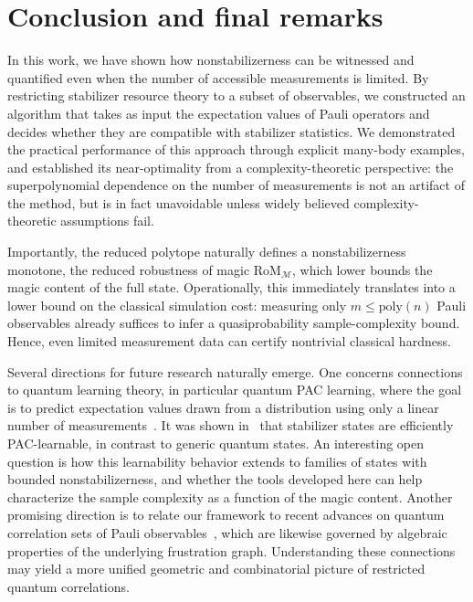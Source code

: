 \documentclass[10pt,aps,pra,twocolumn,floatfix,nofootinbib,superscriptaddress,longbibliography]{revtex4-2}
\newcommand{\1}{\mathbbm{1}}
\begin{document}
\section{Conclusion and final remarks}
\label{sec:discuss}



In this work, we have shown how nonstabilizerness can be witnessed and quantified even when the number of accessible measurements is limited. By restricting stabilizer resource theory to a subset of observables, we constructed an algorithm that takes as input the expectation values of Pauli operators and decides whether they are compatible with stabilizer statistics. We demonstrated the practical performance of this approach through explicit many-body examples, and established its near-optimality from a complexity-theoretic perspective: the superpolynomial dependence on the number of measurements is not an artifact of the method, but is in fact unavoidable unless widely believed complexity-theoretic assumptions fail.

Importantly, the reduced polytope naturally defines a nonstabilizerness monotone, the reduced robustness of magic $\mathrm{RoM}_{\mathcal M}$, which lower bounds the magic content of the full state. Operationally, this immediately translates into a lower bound on the classical simulation cost: measuring only $m \leq \mathrm{poly}(n)$ Pauli observables already suffices to infer a quasiprobability sample-complexity bound. Hence, even limited measurement data can certify nontrivial classical hardness.



Several directions for future research naturally emerge. One concerns connections to quantum learning theory, in particular quantum PAC learning, where the goal is to predict expectation values drawn from a distribution using only a linear number of measurements~\cite{aaronson2007learnability}. It was shown in~\cite{rocchetto2017stabiliser} that stabilizer states are efficiently PAC-learnable, in contrast to generic quantum states. An interesting open question is how this learnability behavior extends to families of states with bounded nonstabilizerness, and whether the tools developed here can help characterize the sample complexity as a function of the magic content. Another promising direction is to relate our framework to recent advances on quantum correlation sets of Pauli observables~\cite{xu2024bounding,xu2025simultaneous}, which are likewise governed by algebraic properties of the underlying frustration graph. Understanding these connections may yield a more unified geometric and combinatorial picture of restricted quantum correlations.
\end{document}
